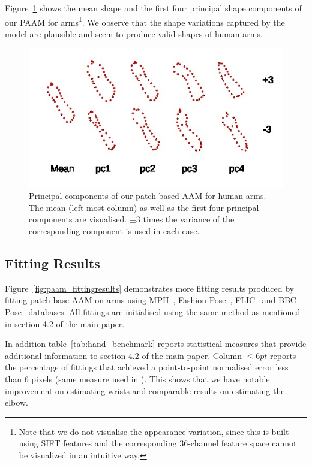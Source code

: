 Figure~\ref{fig:paam_sm} shows the mean shape and the first four principal shape components of our PAAM for arms\footnote{Note that we do not visualise the appearance variation, since this is built using SIFT features and the corresponding 36-channel feature space cannot be visualized in an intuitive way.}. We observe that the shape variations captured by the model are plausible and seem to produce valid shapes of human arms.

\begin{figure}[!t]
\centering
\includegraphics[width=\columnwidth]{resources/Annotation_Correction/Suplementory_Meterial/HandSMPAAM/handsmpaam}
\caption{Principal components of our patch-based AAM for human arms.  The mean (left most column) as well as the first four principal components are visualised. $\pm 3$ times the variance of the corresponding component is used in each case.}
\label{fig:paam_sm}
\end{figure}




\subsection{Fitting Results}
\label{sec:paam_fittingresults}


Figure~\ref{fig:paam_fittingresults} demonstrates more fitting results produced by fitting patch-base AAM on arms using MPII~\cite{andriluka14cvpr}, Fashion Pose~\cite{dantone2013human}, FLIC~\cite{sapp2013modec} and BBC Pose~\cite{pfister2015flowing} databases. All fittings are initialised using the same method as mentioned in section 4.2 of the main paper.


In addition table~\ref{tab:hand_benchmark} reports statistical measures that provide additional information to section 4.2 of the main paper. Column $\leq 6pt$ reports the percentage of fittings that achieved a point-to-point normalised error less than 6 pixels (same measure used in \cite{pfister2015flowing}). This shows that we have notable improvement on estimating wrists and comparable results on estimating the elbow.


